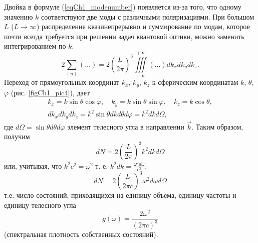 Двойка в формуле (\ref{eqCh1_modenumber}) появляется из-за того, что
одному значению  $k$  соответствуют две моды с различными
поляризациями. При большом $L$ ($L\rightarrow \infty$)  распределение
квазинепрерывно и суммирование по модам,
которое почти всегда требуется при решении задач квантовой оптики,
можно заменить интегрированием
по $k$: 
\begin{equation}
2 \sum_{(n)} \left( \dots \right) = 2 \left(\frac{L}{2 \pi} \right)^3
\iiint\limits_{-\infty}^{+\infty} \left( \dots \right) d k_x d k_y d k_z.
\label{eqCh1_modenumber_kvazy_contig}
\end{equation}
Переход от прямоугольных координат  $k_x$,  $k_y$, $k_z$   к сферическим координатам  
$k$, $\theta$, $\varphi$    (рис. \ref{figCh1_pic4}), дает
\begin{eqnarray}
k_x = k \sin \theta \cos \varphi,
\quad 
k_y = k \sin \theta \sin \varphi,
\quad 
k_z  = k \cos \theta,
\nonumber \\
d k_x d k_y d k_z = k^2 \sin \theta d k d \theta d \varphi = k^2 d k
d \Omega,
\end{eqnarray}
где $d \Omega = \sin \theta d \theta d \varphi$ элемент телесного угла в
направлении  $\vec{k}$.  Таким образом, получим
\begin{equation}
d N = 2 \left(\frac{L}{2 \pi} \right)^3 k^2 d k d \Omega
\label{eqCh1_modenumber_1pre}
\end{equation}
или, учитывая, что $k^2 c^2 = \omega^2$ т. е. $k^2 d k =
\frac{\omega^2 d \omega}{c^3}$: 
\begin{equation}
d N = 2 \left(\frac{L}{2 \pi c} \right)^3 \omega^2 d \omega d \Omega
\label{eqCh1_modenumber_1}
\end{equation}
т.е. число состояний, приходящихся на единицу объема, единицу частоты и единицу телесного угла
\begin{equation}
g\left(\omega\right)  = \frac{2 \omega^2}{\left(2 \pi c\right)^3}
\end{equation}
(спектральная плотность собственных состояний). 
